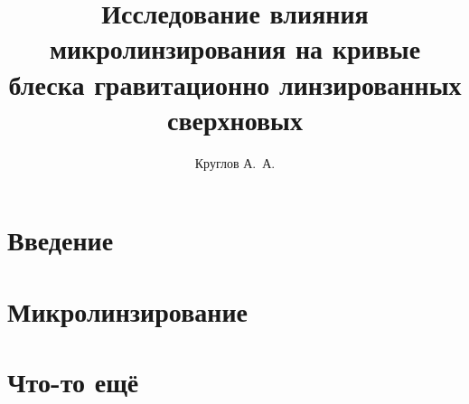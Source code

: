 \documentclass{mipt-thesis-bs}
\title{Исследование влияния микролинзирования на кривые
           блеска гравитационно линзированных сверхновых}
\author{Круглов А.\ А.}
\numberwithin{equation}{chapter}
\begin{document}
    \frontmatter
    
    \titlecontents
    
    \mainmatter


\chapter{Введение}

\chapter{Микролинзирование}
    
\chapter{Что-то ещё}
    


    \backmatter

    \printbib
    
    
\end{document}
